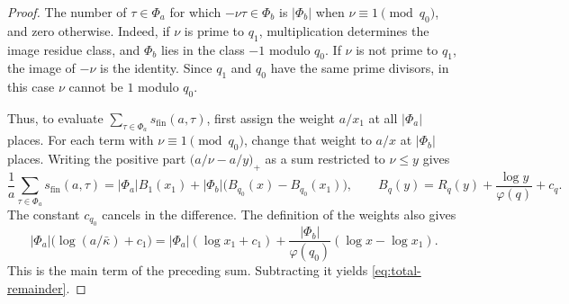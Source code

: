 \begin{proof}
The number of \(\tau\in\Phi_a\) for which \(-\nu\tau\in\Phi_b\) is
\(|\Phi_b|\) when \(\nu\equiv1\pmod{q_0}\), and zero otherwise.
Indeed, if \(\nu\) is prime to \(q_1\), multiplication determines the
image residue class, and \(\Phi_b\) lies in the class \(-1\) modulo \(q_0\).
If \(\nu\) is not prime to \(q_1\), the image of \(-\nu\) is the identity.
Since \(q_1\) and \(q_0\) have the same prime divisors, in this case
\(\nu\) cannot be \(1\) modulo \(q_0\).

Thus, to evaluate \(\sum_{\tau\in\Phi_a}s_{\mathrm{fin}}(a,\tau)\), first
assign the weight \(a/x_1\) at all \(|\Phi_a|\) places. For each term with
\(\nu\equiv1\pmod{q_0}\), change that weight to \(a/x\) at \(|\Phi_b|\) places.
Writing the positive part \(\bigl(a/\nu-a/y\bigr)_+\) as a sum restricted
to \(\nu\le y\) gives
\[
 \frac1a\sum_{\tau\in\Phi_a}s_{\mathrm{fin}}(a,\tau)
  =
 |\Phi_a|B_1(x_1)+|\Phi_b|\bigl(B_{q_0}(x)-B_{q_0}(x_1)\bigr),
 \qquad B_q(y)=R_q(y)+\frac{\log y}{\varphi(q)}+c_q .
\]
The constant \(c_{q_0}\) cancels in the difference. The definition of
the weights also gives
\[
 |\Phi_a|\bigl(\log(a/\bar\kappa)+c_1\bigr)
 =|\Phi_a|(\log x_1+c_1)
   +\frac{|\Phi_b|}{\varphi(q_0)}(\log x-\log x_1).
\]
This is the main term of the preceding sum. Subtracting it yields
\eqref{eq:total-remainder}.
\end{proof}
